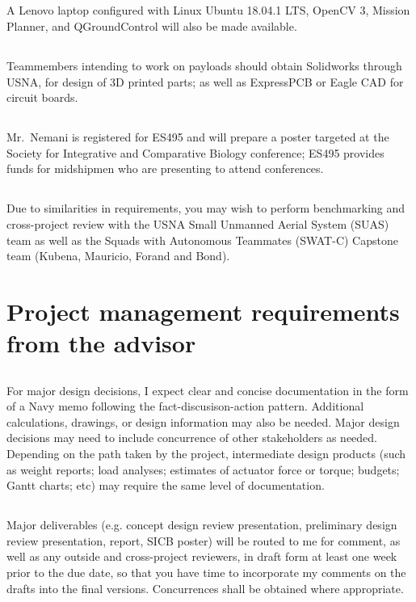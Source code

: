 \documentclass[10pt,courier]{navymemo}
\begin{document}
\subsection{} A Lenovo laptop configured with Linux Ubuntu 18.04.1 LTS, OpenCV 3, Mission Planner, and QGroundControl will also be made available.
\subsection{} Teammembers intending to work on payloads should obtain Solidworks through USNA, for design of 3D printed parts; as well as ExpressPCB or Eagle CAD for circuit boards. 
\subsection{} Mr.~Nemani is registered for ES495 and will prepare a poster targeted at the Society for Integrative and Comparative Biology conference; ES495 provides funds for midshipmen who are presenting to attend conferences.
\subsection{} Due to similarities in requirements, you may wish to perform benchmarking and cross-project review with the USNA Small Unmanned Aerial System (SUAS) team as well as the Squads with Autonomous Teammates (SWAT-C) Capstone team (Kubena, Mauricio, Forand and Bond). 

\section{Project management requirements from the advisor}

\subsection{} For major design decisions, I expect clear and concise documentation in the form of a Navy memo following the fact-discusison-action pattern. Additional calculations, drawings, or design information may also be needed. Major design decisions may need to include concurrence of other stakeholders as needed. Depending on the path taken by the project, intermediate design products (such as weight reports; load analyses; estimates of actuator force or torque; budgets; Gantt charts; etc) may require the same level of documentation. 

\subsection{} Major deliverables (e.g. concept design review presentation, preliminary design review presentation, report, SICB poster) will be routed to me for comment, as well as any outside and cross-project reviewers, in draft form at least one week prior to the due date, so that you have time to incorporate my comments on the drafts into the final versions.  Concurrences shall be obtained where appropriate. 
\end{document}
